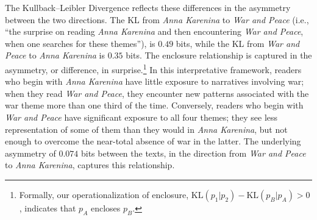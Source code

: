The Kullback--Leibler Divergence reflects these differences in the asymmetry between the two directions. The KL from \emph{Anna Karenina} to \emph{War and Peace} (i.e., ``the surprise on reading \emph{Anna Karenina} and then encountering \emph{War and Peace}, when one searches for these themes''), is $0.49$ bits, while the KL from \emph{War and Peace} to \emph{Anna Karenina} is $0.35$ bits. The enclosure relationship is captured in the asymmetry, or difference, in surprise.\footnote{Formally, our operationalization of enclosure, $\textrm{KL}(p_1|p_2)-\textrm{KL}(p_B|p_A) > 0$, indicates that $p_A$ encloses $p_B$.} In this interpretative framework, readers who begin with \emph{Anna Karenina} have little exposure to narratives involving war; when they read \emph{War and Peace}, they encounter new patterns associated with the war theme more than one third of the time. Conversely, readers who begin with \emph{War and Peace} have significant exposure to all four themes; they see less representation of some of them than they would in \emph{Anna Karenina}, but not enough to overcome the near-total absence of war in the latter. The underlying asymmetry of $0.074$ bits between the texts, in the direction from \emph{War and Peace} to \emph{Anna Karenina}, captures this relationship.
